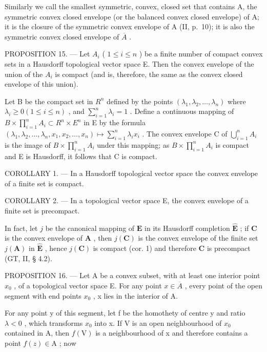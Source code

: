 Similarly we call the smallest symmetric, convex, closed set that contains A, the symmetric convex closed envelope (or the balanced convex closed envelope) of A; it is the closure of the symmetric convex envelope of A (II, p.~10); it is also the symmetric convex closed envelope of \(\overline{A}\) .

PROPOSITION 15. --- Let \(A_{i}\) ( \(1 \leqslant i \leqslant n\) ) be a finite number of compact convex sets in a Hausdorff topological vector space E. Then the convex envelope of the union of the \(A_{i}\) is compact (and is, therefore, the same as the convex closed envelope of this union).

Let B be the compact set in \(R^{n}\) defined by the points \((\lambda_{1},\lambda_{2},\ldots,\lambda_{n})\) where \(\lambda_{i}\geqslant0(1\leqslant i\leqslant n)\) , and \(\sum_{i=1}^{n}\lambda_{i}=1\) . Define a continuous mapping of \(B\times\prod_{i=1}^{n}A_{i}\subset R^{n}\times E^{n}\) in E by the formula \((\lambda_{1},\lambda_{2},\ldots,\lambda_{n},x_{1},x_{2},\ldots,x_{n})\mapsto\sum_{i=1}^{n}\lambda_{i}x_{i}\) . The convex envelope C of \(\bigcup_{i=1}^{n}A_{i}\) is the image of \(B\times\prod_{i=1}^{n}A_{i}\) under this mapping; as \(B\times\prod_{i=1}^{n}A_{i}\) is compact and E is Hausdorff, it follows that C is compact.

COROLLARY 1. --- In a Hausdorff topological vector space the convex envelope of a finite set is compact.

COROLLARY 2. --- In a topological vector space E, the convex envelope of a finite set is precompact.

In fact, let \(j\) be the canonical mapping of \(\mathbf{E}\) in its Hausdorff completion \(\hat{\mathbf{E}}\) ; if \(\mathbf{C}\) is the convex envelope of \(\mathbf{A}\) , then \(j(\mathbf{C})\) is the convex envelope of the finite set \(j(\mathbf{A})\) in \(\hat{\mathbf{E}}\) , hence \(j(\mathbf{C})\) is compact (cor. 1) and therefore \(\mathbf{C}\) is precompact (GT, II, § 4.2).

PROPOSITION 16. --- Let A be a convex subset, with at least one interior point \(x_{0}\) , of a topological vector space E. For any point \(x \in \overline{A}\) , every point of the open segment with end points \(x_{0}\) , x lies in the interior of A.

For any point y of this segment, let f be the homothety of centre y and ratio \(\lambda < 0\) , which transforms \(x_{0}\) into x. If V is an open neighbourhood of \(x_{0}\) contained in A, then \(f(\mathrm{V})\) is a neighbourhood of x and therefore contains a point \(f(z) \in \mathrm{A}\) ; now

